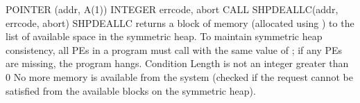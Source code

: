 \synF   %

POINTER (addr, A(1))
INTEGER errcode, abort
CALL SHPDEALLC(addr, errcode, abort) %
 {
       SHPDEALLC  returns  a block of memory (allocated using ) to the
       list of available space in the symmetric heap.  To  maintain  symmetric
       heap  consistency, all \ac{PE}s in a program must call
        with the same value of ; if  any \ac{PE}s  are missing, the
       program hangs.
  }
{
\desR{ }
 {Condition}
 {Length is not an integer greater than 0}
 { No more memory is available from the system (checked if the  request  cannot  be	satisfied from the available blocks on the symmetric heap).}
}%
\eAPI 
